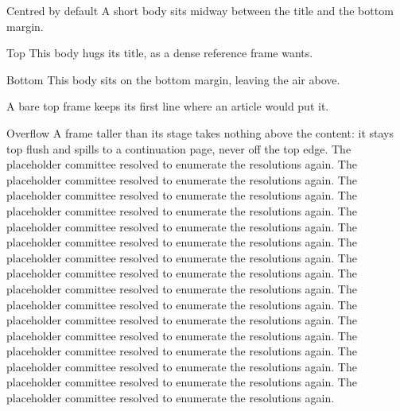 \documentclass[aspectratio=169]{slides}
\begin{document}
\begin{frame}{Centred by default}
A short body sits midway between the title and the bottom margin.
\end{frame}

\begin{frame}[t]{Top}
This body hugs its title, as a dense reference frame wants.
\end{frame}

\begin{frame}[b]{Bottom}
This body sits on the bottom margin, leaving the air above.
\end{frame}

\begin{frame}[t]
A bare top frame keeps its first line where an article would put it.
\end{frame}

\begin{frame}{Overflow}
A frame taller than its stage takes nothing above the content: it stays
top flush and spills to a continuation page, never off the top edge.
The placeholder committee resolved to enumerate the resolutions again.
The placeholder committee resolved to enumerate the resolutions again.
The placeholder committee resolved to enumerate the resolutions again.
The placeholder committee resolved to enumerate the resolutions again.
The placeholder committee resolved to enumerate the resolutions again.
The placeholder committee resolved to enumerate the resolutions again.
The placeholder committee resolved to enumerate the resolutions again.
The placeholder committee resolved to enumerate the resolutions again.
The placeholder committee resolved to enumerate the resolutions again.
The placeholder committee resolved to enumerate the resolutions again.
The placeholder committee resolved to enumerate the resolutions again.
The placeholder committee resolved to enumerate the resolutions again.
The placeholder committee resolved to enumerate the resolutions again.
The placeholder committee resolved to enumerate the resolutions again.
The placeholder committee resolved to enumerate the resolutions again.
The placeholder committee resolved to enumerate the resolutions again.
\end{frame}
\end{document}
